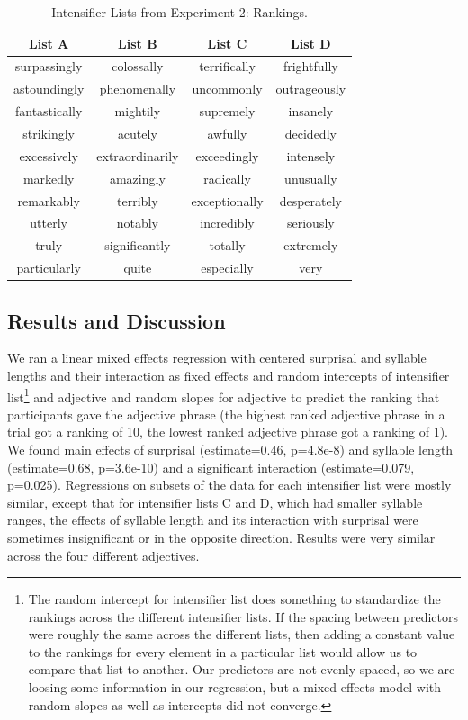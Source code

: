 \documentclass[10pt,letterpaper]{article}
\begin{document}
\begin{table}[ht]
\begin{center} 
\caption{Intensifier Lists from Experiment 2: Rankings.} 
\label{exp2-intensifiers} 
\vskip 0.12in
\begin{tabular}{cccc} 
\hline
List A    &  List B & List C & List D \\
\hline
surpassingly & colossally & terrifically & frightfully \\
astoundingly & phenomenally & uncommonly & outrageously \\
fantastically & mightily & supremely & insanely \\
strikingly & acutely & awfully & decidedly \\
excessively & extraordinarily & exceedingly & intensely \\
markedly & amazingly & radically & unusually \\
remarkably & terribly & exceptionally & desperately \\
utterly & notably & incredibly & seriously \\
truly & significantly & totally & extremely \\
particularly & quite & especially & very
\end{tabular}
\end{center}
\end{table}

\subsection{Results and Discussion}

We ran a linear mixed effects regression with centered surprisal and syllable lengths and their interaction as fixed effects and random intercepts of intensifier list\footnote{The random intercept for intensifier list does something to standardize the rankings across the different intensifier lists. If the spacing between predictors were roughly the same across the different lists, then adding a constant value to the rankings for every element in a particular list would allow us to compare that list to another. Our predictors are not evenly spaced, so we are loosing some information in our regression, but a mixed effects model with random slopes as well as intercepts did not converge.} and adjective and random slopes for adjective to predict the ranking that participants gave the adjective phrase (the highest ranked adjective phrase in a trial got a ranking of 10, the lowest ranked adjective phrase got a ranking of 1). We found main effects of surprisal (estimate=0.46, p=4.8e-8) and syllable length (estimate=0.68, p=3.6e-10) and a significant interaction (estimate=0.079, p=0.025). Regressions on subsets of the data for each intensifier list were mostly similar, except that for intensifier lists C and D, which had smaller syllable ranges, the effects of syllable length and its interaction with surprisal were sometimes insignificant or in the opposite direction. Results were very similar across the four different adjectives.
\end{document}
